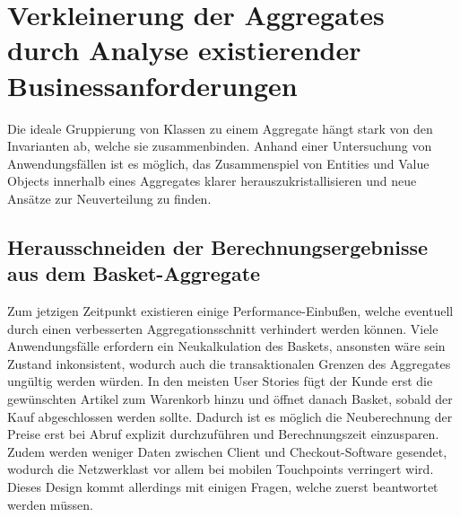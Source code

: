 

\section{Verkleinerung der Aggregates durch Analyse existierender Businessanforderungen}

Die ideale Gruppierung von Klassen zu einem Aggregate hängt stark von den Invarianten ab, welche sie zusammenbinden. Anhand einer Untersuchung von Anwendungsfällen ist es möglich, das Zusammenspiel von Entities und Value Objects innerhalb eines Aggregates klarer herauszukristallisieren und neue Ansätze zur Neuverteilung zu finden.

\subsection{Herausschneiden der Berechnungsergebnisse aus dem Basket-Aggregate}

Zum jetzigen Zeitpunkt existieren einige Performance-Einbußen, welche eventuell durch einen verbesserten Aggregationsschnitt verhindert werden können. Viele Anwendungsfälle erfordern ein Neukalkulation des Baskets, ansonsten wäre sein Zustand inkonsistent, wodurch auch die transaktionalen Grenzen des Aggregates ungültig werden würden. In den meisten User Stories fügt der Kunde erst die gewünschten Artikel zum Warenkorb hinzu und öffnet danach Basket, sobald der Kauf abgeschlossen werden sollte. Dadurch ist es möglich die Neuberechnung der Preise erst bei Abruf explizit durchzuführen und Berechnungszeit einzusparen. Zudem werden weniger Daten zwischen Client und Checkout-Software gesendet, wodurch die Netzwerklast vor allem bei mobilen Touchpoints verringert wird. Dieses Design kommt allerdings mit einigen Fragen, welche zuerst beantwortet werden müssen.


